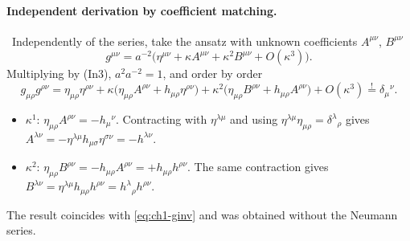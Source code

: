 \paragraph{Independent derivation by coefficient matching.} \tD\ Independently
of the series, take the ansatz with unknown coefficients $A^{\mu\nu}$,
$B^{\mu\nu}$
\begin{equation}
g^{\mu\nu}=a^{-2}\big(\eta^{\mu\nu}+\kappa A^{\mu\nu}+\kappa^2B^{\mu\nu}+O(\kappa^3)\big).
\label{eq:ch1-ansatz}
\end{equation}
Multiplying by (In3), $a^2a^{-2}=1$, and order by order
\begin{equation*}
g_{\mu\rho}g^{\rho\nu}=\eta_{\mu\rho}\eta^{\rho\nu}
+\kappa\big(\eta_{\mu\rho}A^{\rho\nu}+h_{\mu\rho}\eta^{\rho\nu}\big)
+\kappa^2\big(\eta_{\mu\rho}B^{\rho\nu}+h_{\mu\rho}A^{\rho\nu}\big)+O(\kappa^3)\overset{!}{=}\delta_\mu{}^\nu .
\end{equation*}
\begin{itemize}[leftmargin=1.4em]
\item $\kappa^1$: $\eta_{\mu\rho}A^{\rho\nu}=-h_\mu{}^\nu$. Contracting with
$\eta^{\lambda\mu}$ and using $\eta^{\lambda\mu}\eta_{\mu\rho}=\delta^\lambda{}_\rho$
gives $A^{\lambda\nu}=-\eta^{\lambda\mu}h_{\mu\sigma}\eta^{\sigma\nu}=-h^{\lambda\nu}$.
\item $\kappa^2$: $\eta_{\mu\rho}B^{\rho\nu}=-h_{\mu\rho}A^{\rho\nu}=+h_{\mu\rho}h^{\rho\nu}$.
The same contraction gives
$B^{\lambda\nu}=\eta^{\lambda\mu}h_{\mu\rho}h^{\rho\nu}=h^\lambda{}_\rho h^{\rho\nu}$.
\end{itemize}
The result coincides with \eqref{eq:ch1-ginv} and was obtained without the
Neumann series.

